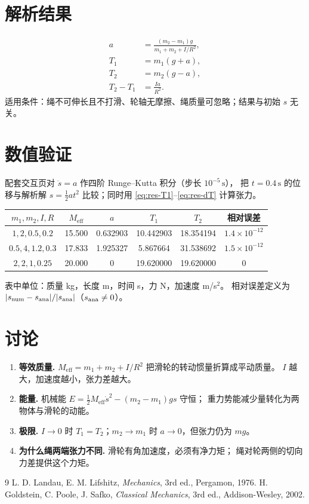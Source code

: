 \documentclass[UTF8,a4paper,11pt]{ctexart}
\begin{document}
\section{解析结果}\label{sec:result}

\begin{align}
  a&=\frac{(m_2-m_1)g}{m_1+m_2+I/R^2}, \label{eq:res-a}\\
  T_1&=m_1\left(g+a\right), \label{eq:res-T1}\\
  T_2&=m_2\left(g-a\right), \label{eq:res-T2}\\
  T_2-T_1&=\frac{Ia}{R^2}. \label{eq:res-dT}
\end{align}
适用条件：绳不可伸长且不打滑、轮轴无摩擦、绳质量可忽略；结果与初始 $s$ 无关。

\section{数值验证}\label{sec:numeric}

配套交互页对 $\ddot s=a$ 作四阶 Runge--Kutta 积分（步长 $10^{-5}\,\mathrm{s}$），
把 $t=0.4\,\mathrm{s}$ 的位移与解析解 $s=\tfrac12 at^2$ 比较；同时用
\eqref{eq:res-T1}--\eqref{eq:res-dT} 计算张力。

\begin{center}
\small
\begin{tabular}{cccccc}
\toprule
$m_1,m_2,I,R$ & $M_{\mathrm{eff}}$ & $a$ & $T_1$ & $T_2$ & 相对误差 \\
\midrule
$1,2,0.5,0.2$ & 15.500 & 0.632903 & 10.442903 & 18.354194 & $1.4\times10^{-12}$ \\
$0.5,4,1.2,0.3$ & 17.833 & 1.925327 & 5.867664 & 31.538692 & $1.5\times10^{-12}$ \\
$2,2,1,0.25$ & 20.000 & 0 & 19.620000 & 19.620000 & $0$ \\
\bottomrule
\end{tabular}
\end{center}

表中单位：质量 kg，长度 m，时间 s，力 N，加速度 m/s$^2$。
相对误差定义为 $|s_{\rm num}-s_{\rm ana}|/|s_{\rm ana}|$（$s_{\rm ana}\neq0$）。

\section{讨论}

\begin{enumerate}
  \item \textbf{等效质量.} $M_{\mathrm{eff}}=m_1+m_2+I/R^2$ 把滑轮的转动惯量折算成平动质量。
        $I$ 越大，加速度越小，张力差越大。
  \item \textbf{能量.} 机械能 $E=\tfrac12M_{\mathrm{eff}}\dot s^2-(m_2-m_1)gs$ 守恒；
        重力势能减少量转化为两物体与滑轮的动能。
  \item \textbf{极限.} $I\to0$ 时 $T_1=T_2$；$m_2\to m_1$ 时 $a\to0$，但张力仍为 $mg$。
  \item \textbf{为什么绳两端张力不同.} 滑轮有角加速度，必须有净力矩；
        绳对轮两侧的切向力差提供这个力矩。
\end{enumerate}

\begin{thebibliography}{9}
 L. D. Landau, E. M. Lifshitz, \emph{Mechanics}, 3rd ed., Pergamon, 1976.
 H. Goldstein, C. Poole, J. Safko, \emph{Classical Mechanics}, 3rd ed., Addison-Wesley, 2002.
\end{thebibliography}
\end{document}
